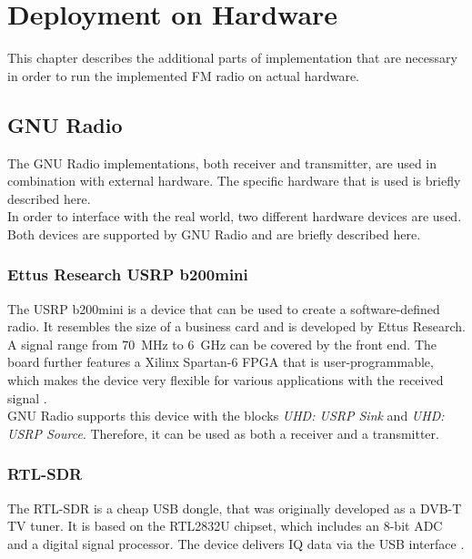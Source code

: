 \chapter{Deployment on Hardware}
\label{cha:DeploymentOnHardware}

This chapter describes the additional parts of implementation that are necessary in order to run the implemented FM radio on actual hardware.

\section{GNU Radio}

The GNU Radio implementations, both receiver and transmitter, are used in combination with external hardware.
The specific hardware that is used is briefly described here.\\

In order to interface with the real world, two different hardware devices are used.
Both devices are supported by GNU Radio and are briefly described here.

\subsection{Ettus Research USRP b200mini}

The USRP b200mini is a device that can be used to create a software-defined radio.
It resembles the size of a business card and is developed by Ettus Research.
A signal range from 70~MHz to 6~GHz can be covered by the front end.
The board further features a Xilinx Spartan-6 FPGA that is user-programmable, which makes the device very flexible for various applications with the received signal \cite{USRPb200Mini}.\\

GNU Radio supports this device with the blocks \textit{UHD: USRP Sink} and \textit{UHD: USRP Source}.
Therefore, it can be used as both a receiver and a transmitter.

\subsection{RTL-SDR}

The RTL-SDR is a cheap USB dongle, that was originally developed as a DVB-T TV tuner.
It is based on the RTL2832U chipset, which includes an 8-bit ADC and a digital signal processor.
The device delivers IQ data via the USB interface \cite{RTLSDR}.\\

